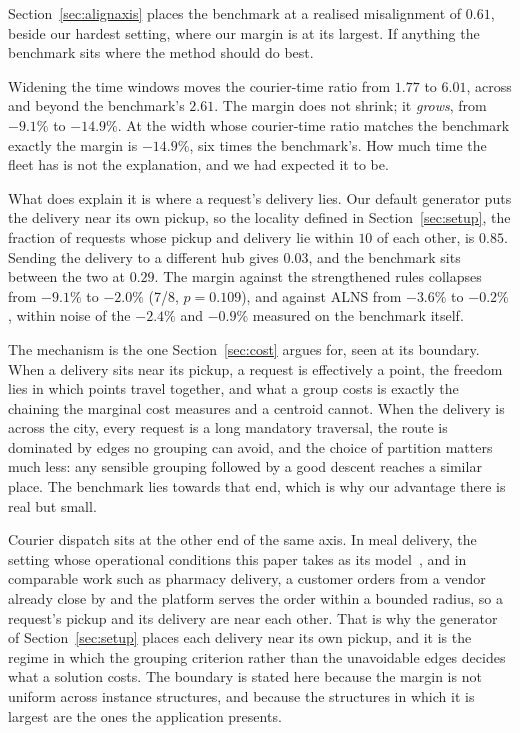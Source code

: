  Section~\ref{sec:alignaxis} places the
benchmark at a realised misalignment of $0.61$, beside our hardest setting,
where our margin is at its largest. If anything the benchmark sits where the
method should do best.

 Widening the time windows moves the
courier-time ratio from $1.77$ to
$6.01$, across and beyond the benchmark's $2.61$. The
margin does not shrink; it \emph{grows}, from $-9.1\%$ to
$-14.9\%$. At the width whose courier-time ratio matches the
benchmark exactly the margin is $-14.9\%$,
six times the benchmark's. How much time the fleet has is not the explanation,
and we had expected it to be.

 What does explain it is where a
request's delivery lies. Our default generator puts the delivery near its own
pickup, so the locality defined in Section~\ref{sec:setup}, the fraction of
requests whose pickup and delivery lie within $10$ of each other, is
$0.85$. Sending the delivery to a different hub gives
$0.03$, and the benchmark sits between the two at $0.29$. The margin
against the strengthened rules collapses from $-9.1\%$ to
$-2.0\%$ (7/8, $p=0.109$), and against
ALNS from $-3.6\%$ to $-0.2\%$, within noise of
the $-2.4\%$ and $-0.9\%$ measured on the benchmark
itself.

The mechanism is the one Section~\ref{sec:cost} argues for, seen at its
boundary. When a
delivery sits near its pickup, a request is effectively a point, the freedom
lies in which points travel together, and what a group costs is exactly the
chaining the marginal cost measures and a centroid cannot. When the delivery is
across the city, every request is a long mandatory traversal, the route is
dominated by edges no grouping can avoid, and the choice of partition matters
much less: any sensible grouping followed by a good descent reaches a similar
place. The benchmark lies towards that end, which is why our advantage there is
real but small.

Courier dispatch sits at the other end of the same axis. In meal delivery, the
setting whose operational conditions this paper
takes as its model~\citep{reyes2018meal, yildiz2019provably,
ulmer2021restaurant}, and in comparable work such as pharmacy delivery, a
customer orders from a vendor already close by and the platform serves the order
within a bounded radius, so a request's pickup and its delivery are near each
other. That is why the generator of Section~\ref{sec:setup} places each
delivery near its own pickup, and it is the regime in which the grouping
criterion rather than the unavoidable edges decides what a solution costs. The
boundary is stated here because the margin is not uniform across instance
structures, and because the structures in which it is largest are the ones the
application presents.


